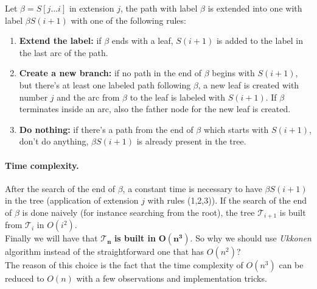 Let $\beta = S[j \dots i]$ in extension $j$, the path with label $\beta$ is extended into one with label $\beta S(i+1)$ with one of the following rules:
\begin{enumerate}
	\item \textbf{Extend the label:} if $\beta$ ends with a leaf, $S(i+1)$ is added to the label in the last arc of the path.
	\item \textbf{Create a new branch:} if no path in the end of $\beta$ begins with $S(i+1)$, but there's at least one labeled path following $\beta$, a new leaf is created with number $j$ and the arc from $\beta$ to the leaf is labeled with $S(i+1)$. If $\beta$ terminates inside an arc, also the father node for the new leaf is created.
	\item \textbf{Do nothing:} if there's a path from the end of $\beta$ which starts with $S(i+1)$, don't do anything, $\beta S(i+1)$ is already present in the tree.
\end{enumerate}

\paragraph*{Time complexity.} After the search of the end of $\beta$, a constant time is necessary to have $\beta S(i+1)$ in the tree (application of extension $j$ with rules (1,2,3)). If the search of the end of $\beta$ is done naively (for instance searching from the root), the tree $\mathcal{T}_{i+1}$ is built from $\mathcal{T}_i$ in $O(i^2)$.\\
Finally we will have that $\mathbf{\mathcal{T}_n}$ \textbf{is built in} $\mathbf{O(n^3)}$. So why we should use \textit{Ukkonen} algorithm instead of the straightforward one that has $O(n^2)$?\\
The reason of this choice is the fact that the time complexity of $O(n^3)$ can be reduced to $O(n)$ with a few observations and implementation tricks.

